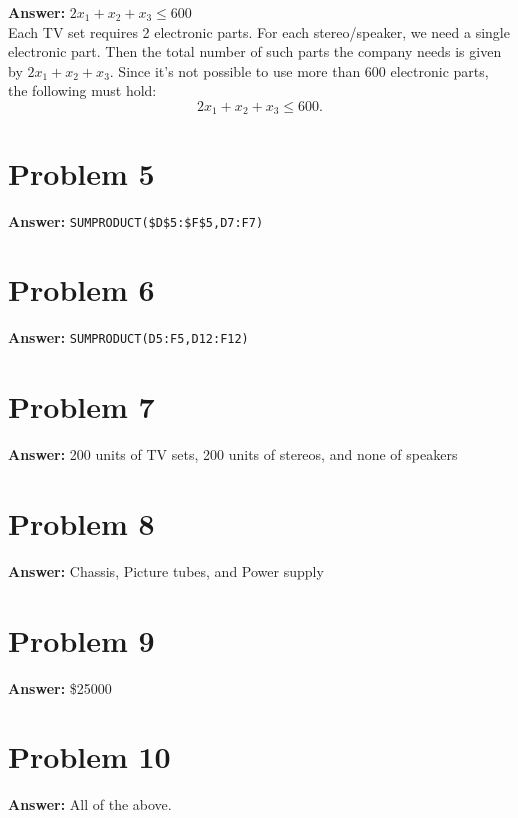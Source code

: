 \documentclass[11pt]{article}
\begin{document}
\textbf{Answer:} \(2x_1+x_2+x_3\leq 600\)\\

Each TV set requires 2 electronic parts. For each stereo/speaker, we need a
single electronic part. Then the total number of such parts the company needs is
given by \(2x_1+x_2+x_3\). Since it's not possible to use more than 600
electronic parts, the following must hold:
\begin{equation}
2x_1+x_2+x_3\leq 600.
\end{equation}
\section*{Problem 5}
\label{sec:org8e2f37c}

\textbf{Answer:} \texttt{SUMPRODUCT(\$D\$5:\$F\$5,D7:F7)}
\section*{Problem 6}
\label{sec:org0c48417}

\textbf{Answer:} \texttt{SUMPRODUCT(D5:F5,D12:F12)}
\section*{Problem 7}
\label{sec:org91fbc11}

\textbf{Answer:} 200 units of TV sets, 200 units of stereos, and none of speakers
\section*{Problem 8}
\label{sec:org2b25ee9}

\textbf{Answer:} Chassis, Picture tubes, and Power supply
\section*{Problem 9}
\label{sec:org961c144}

\textbf{Answer:} \$25000
\section*{Problem 10}
\label{sec:org32a2c13}

\textbf{Answer:} All of the above.
\end{document}
